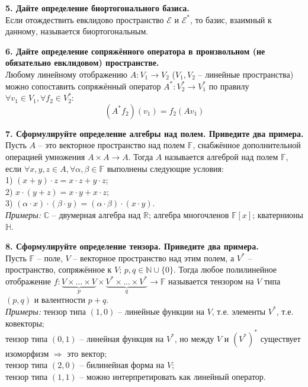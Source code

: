 \documentclass[11pt,a4paper]{article}
\renewcommand{\C}{\mathbb{C}}
\newcommand{\R}{\mathbb{R}}
\newcommand{\F}{\mathbb{F}}
\begin{document}
\textbf{5. Дайте определение биортогонального базиса.\\}
Если отождествить евклидово пространство $\mathcal{E}$ и $\mathcal{E}^*$, то базис, взаимный к данному, называется биортогональным.

\textbf{6. Дайте определение сопряжённого оператора в произвольном (не обязательно евклидовом) пространстве.\\}
Любому линейному отображению $A : V_1 \rightarrow V_2$ ($V_1, V_2$ -- линейные пространства) можно сопоставить сопряжённый оператор $A^* : V_2^*\rightarrow V_1^*$ по правилу $\forall v_1 \in V_1, \forall f_2 \in V_2^*$: $$(A^* f_2)(v_1) = f_2 (A v_1)$$

\textbf{7. Сформулируйте определение алгебры над полем. Приведите два примера.\\}
Пусть $A$ -- это векторное пространство над полем $\F$, снабжённое дополнительной операцией умножения $A \times A \rightarrow A$. Тогда $A$ называется алгеброй над полем $\F$, если $\forall x, y, z \in A, \forall \alpha, \beta \in \F$ выполнены следующие условия:\\
1) $(x + y) \cdot z = x \cdot z + y \cdot z$;\\
2) $x \cdot (y + z) = x \cdot y + x \cdot z$;\\
3) $(\alpha \cdot x) \cdot (\beta \cdot y) = (\alpha \cdot \beta) \cdot (x \cdot y)$.\\
\textit{Примеры:} $\C$ -- двумерная алгебра над $\R$; алгебра многочленов $\F [x]$; кватернионы $\mathbb{H}$.

\textbf{8. Сформулируйте определение тензора. Приведите два примера.\\}
Пусть $\F$ -- поле, $V$ -- векторное пространство над этим полем, а $V^*$ -- пространство, сопряжённое к $V$; $p, q \in \mathbb{N} \cup \{ 0 \}$. Тогда любое полилинейное отображение $f: \underbrace{ V \times \dots \times V }_{p} \times \underbrace{ V^* \times \dots \times V^* }_{q} \rightarrow \F$ называется тензором на $V$ типа $(p, q)$ и валентности $p + q$.\\
\textit{Примеры:} тензор типа $(1, 0)$ -- линейные функции на $V$, т.е. элементы $V^*$, т.е. ковекторы;\\
тензор типа $(0, 1)$ -- линейная функция на $V^*$, но между $V$ и $(V^*)^*$ существует изоморфизм $\Rightarrow$ это вектор;\\
тензор типа $(2, 0)$ -- билинейная форма на $V$;\\
тензор типа $(1, 1)$ -- можно интерпретировать как линейный оператор.
\end{document}
